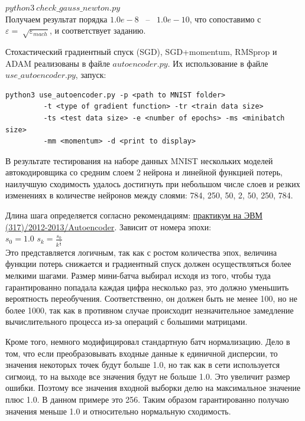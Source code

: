 \documentclass[oneside,final,12pt]{extreport}
\begin{document}
$python3 \ check\_gauss\_newton.py$ \\


Получаем результат порядка $1.0e-8$ \ -- \ $1.0e-10$, что сопоставимо с $\varepsilon=\sqrt[]{\varepsilon_{mach}}$, и соответствует заданию.


Стохастический градиентный спуск (SGD), SGD+momentum, RMSprop и ADAM реализованы в файле $autoencoder.py$. Их использование в файле $use\_autoencoder.py$, запуск:



\begin{verbatim}
python3 use_autoencoder.py -p <path to MNIST folder> 
         -t <type of gradient function> -tr <train data size> 
         -ts <test data size> -e <number of epochs> -ms <minibatch size> 
         -mm <momentum> -d <print to display>
\end{verbatim}


В результате тестирования на наборе данных MNIST нескольких моделей автокодировщика со средним слоем 2 нейрона и линейной функцией потерь, наилучшую сходимость удалось достигнуть при небольшом числе слоев и резких изменениях в количестве нейронов между слоями: 784, 250, 50, 2, 50, 250, 784.


Длина шага определяется согласно рекомендациям: \href{http://www.machinelearning.ru/wiki/index.php?title=Практикум_на_ЭВМ_(317)/2012-2013/Autoencoder}{практикум на ЭВМ (317)/2012-2013/Autoencoder}. Зависит от номера эпохи: \\


$s_0 = 1.0$
$s_k = \frac{s_0}{k^{\frac{1}{4}}}$ \\


Это представляется логичным, так как с ростом количества эпох, величина функции потерь снижается и градиентный спуск должен осуществляться более мелкими шагами. Размер мини-батча выбирал исходя из того, чтобы туда гарантированно попадала каждая цифра несколько раз, это должно уменьшить вероятность переобучения. Соответственно, он должен быть не менее 100, но не более 1000, так как в противном случае происходит незначительное замедление вычислительного процесса из-за операций с большими матрицами.


Кроме того, немного модифицировал стандартную батч нормализацию. Дело в том, что если преобразовывать входные данные к единичной дисперсии, то значения некоторых точек будут больше 1.0, но так как в сети используется сигмоид, то на выходе все значения будут не больше 1.0. Это увеличит размер ошибки. Поэтому все значения входной выборки делю на максимальное значение плюс 1.0. В данном примере это 256. Таким образом гарантированно получаю значения меньше 1.0 и относительно нормальную сходимость.
\end{document}
